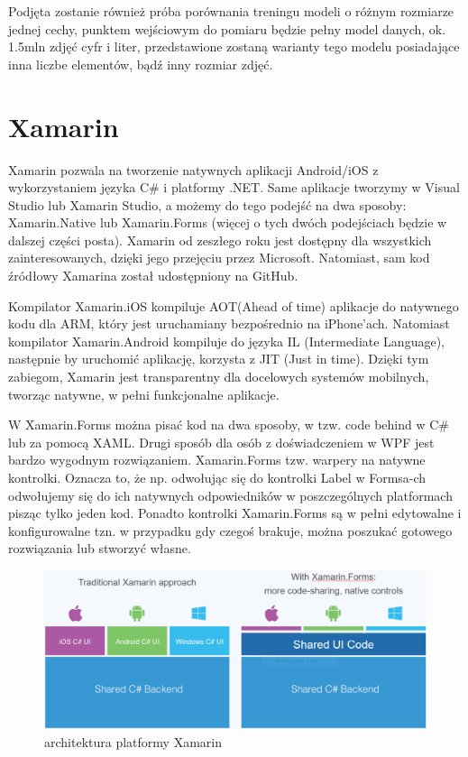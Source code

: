 \documentclass[brudnopis]{xmgr}
\begin{document}
Podjęta zostanie również próba porównania treningu modeli o różnym rozmiarze jednej cechy, punktem wejściowym do pomiaru będzie pełny model danych, ok. 1.5mln zdjęć cyfr i liter, przedstawione zostaną warianty tego modelu posiadające inna liczbe elementów, bądź inny rozmiar zdjęć.

\section{Xamarin}

Xamarin pozwala na tworzenie natywnych aplikacji Android/iOS z wykorzystaniem języka C\# i platformy .NET. Same aplikacje tworzymy w Visual Studio lub Xamarin Studio, a możemy do tego podejść na dwa sposoby: Xamarin.Native lub Xamarin.Forms (więcej o tych dwóch podejściach będzie w dalszej części posta). Xamarin od zeszłego roku jest dostępny dla wszystkich zainteresowanych, dzięki jego przejęciu przez Microsoft. Natomiast, sam kod źródłowy Xamarina został udostępniony na GitHub.

Kompilator Xamarin.iOS kompiluje AOT(Ahead of time) aplikacje do natywnego kodu dla ARM, który jest uruchamiany bezpośrednio na iPhone’ach.
Natomiast kompilator Xamarin.Android kompiluje do języka IL (Intermediate Language), następnie by uruchomić aplikację, korzysta z JIT (Just in time).
Dzięki tym zabiegom, Xamarin jest transparentny dla docelowych systemów mobilnych, tworząc natywne, w pełni funkcjonalne aplikacje.

W Xamarin.Forms można pisać kod na dwa sposoby, w tzw. code behind w C\# lub za pomocą XAML. Drugi sposób dla osób z doświadczeniem w WPF jest bardzo wygodnym rozwiązaniem. Xamarin.Forms tzw. warpery na natywne kontrolki. Oznacza to, że np. odwołując się do kontrolki Label w Formsa-ch odwołujemy się do ich natywnych odpowiedników w poszczególnych platformach pisząc tylko jeden kod. Ponadto kontrolki Xamarin.Forms są w pełni edytowalne i konfigurowalne tzn. w przypadku gdy czegoś brakuje, można poszukać gotowego rozwiązania lub stworzyć własne.

\begin{figure}[!tbh]
\centering
\includegraphics[width=1\hsize]{fig/xamarin}
\caption{architektura platformy Xamarin}
\end{figure}
\newpage
\end{document}
